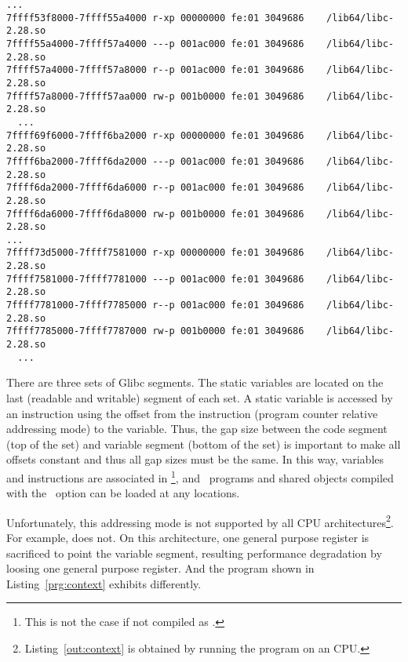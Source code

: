 \begin{lstlisting}[basicstyle=\tiny\tt, frame=tRBl, label=out:glibc-segs]
  ...
7ffff53f8000-7ffff55a4000 r-xp 00000000 fe:01 3049686    /lib64/libc-2.28.so
7ffff55a4000-7ffff57a4000 ---p 001ac000 fe:01 3049686    /lib64/libc-2.28.so
7ffff57a4000-7ffff57a8000 r--p 001ac000 fe:01 3049686    /lib64/libc-2.28.so
7ffff57a8000-7ffff57aa000 rw-p 001b0000 fe:01 3049686    /lib64/libc-2.28.so
  ...
7ffff69f6000-7ffff6ba2000 r-xp 00000000 fe:01 3049686    /lib64/libc-2.28.so
7ffff6ba2000-7ffff6da2000 ---p 001ac000 fe:01 3049686    /lib64/libc-2.28.so
7ffff6da2000-7ffff6da6000 r--p 001ac000 fe:01 3049686    /lib64/libc-2.28.so
7ffff6da6000-7ffff6da8000 rw-p 001b0000 fe:01 3049686    /lib64/libc-2.28.so
...
7ffff73d5000-7ffff7581000 r-xp 00000000 fe:01 3049686    /lib64/libc-2.28.so
7ffff7581000-7ffff7781000 ---p 001ac000 fe:01 3049686    /lib64/libc-2.28.so
7ffff7781000-7ffff7785000 r--p 001ac000 fe:01 3049686    /lib64/libc-2.28.so
7ffff7785000-7ffff7787000 rw-p 001b0000 fe:01 3049686    /lib64/libc-2.28.so
  ...
\end{lstlisting}

There are three sets of Glibc segments. The static variables are
located on the last (readable and writable) segment of each set. A
static variable is accessed by an instruction using the offset from
the instruction (program counter relative addressing mode) to the
variable. Thus, the gap size between the code segment (top of the set)
and variable segment (bottom of the set) is important to make all
offsets constant and thus all gap sizes must be the same. In this way,
variables and instructions are associated in \PIE\footnote{This is
not the case if not compiled as \PIE.}, and \PIE\ programs and shared
objects compiled with the \PIC\ option can be loaded at any locations.

Unfortunately, this addressing mode is not supported by all CPU
architectures\footnote{Listing~\ref{out:context} is obtained by
running the program on an \AMD CPU.}. For example, \INTEL 
does not. On this architecture, one general purpose
register is sacrificed to point the variable segment, resulting
performance degradation by loosing one general purpose register. And
the program shown in Listing~\ref{prg:context} exhibits differently. 
